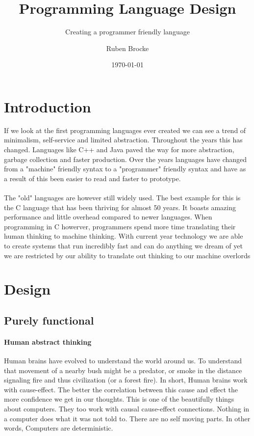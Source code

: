 \documentclass{scrartcl}
\author{Ruben Brocke}
\title{Programming Language Design}
\subtitle{Creating a programmer friendly language}
\date{\today}
\begin{document}
    \pagecolor{yellow!10}
    \begin{titlepage}
        \clearpage
        \maketitle
        \thispagestyle{empty}
    \end{titlepage}
    \newpage

    \tableofcontents
    \newpage

    \section{Introduction}
    If we look at the first programming languages ever created
    we can see a trend of minimalism, self-service and limited abstraction.
    Throughout the years this has changed. Languages like C++ and Java
    paved the way for more abstraction, garbage collection and faster production.
    Over the years languages have changed from a "machine" friendly syntax
    to a "programmer" friendly syntax and have as a result of this been
    easier to read and faster to prototype.
    \paragraph{}
    The "old" languages are however still widely used. The best example for
    this is the C language that has been thriving for almost 50 years. 
    It boasts amazing performance and little overhead compared to newer languages.
    When programming in C howerver, programmers spend more time translating their
    human thinking to machine thinking. With current year technology we are
    able to create systems that run incredibly fast and can do anything we dream of
    yet we are restricted by our ability to translate out thinking to our machine overlords
    \newpage

    \section{Design}
    \subsection{Purely functional}
    \paragraph{Human abstract thinking}
    Human brains have evolved to understand the world around us. To understand that
    movement of a nearby bush might be a predator, or smoke in the distance
    signaling fire and thus civilization (or a forest fire). In short, Human brains
    work with cause-effect. The better the correlation between this cause and effect
    the more confidence we get in our thoughts. This is one of the beautifully things 
    about computers. They too work with causal cause-effect connections. Nothing in a
    computer does what it was not told to. There are no self moving parts. In other words,
    Computers are deterministic. 
\end{document}
